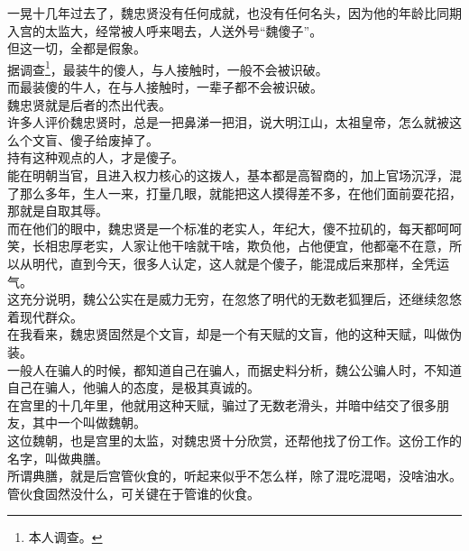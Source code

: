 \begin{multicols}{\theparacolNo}
一晃十几年过去了，魏忠贤没有任何成就，也没有任何名头，因为他的年龄比同期入宫的太监大，经常被人呼来喝去，人送外号“魏傻子”。\\

但这一切，全都是假象。\\

据调查\footnote{本人调查。}，最装牛的傻人，与人接触时，一般不会被识破。\\

而最装傻的牛人，在与人接触时，一辈子都不会被识破。\\

魏忠贤就是后者的杰出代表。\\

许多人评价魏忠贤时，总是一把鼻涕一把泪，说大明江山，太祖皇帝，怎么就被这么个文盲、傻子给废掉了。\\

持有这种观点的人，才是傻子。\\

能在明朝当官，且进入权力核心的这拨人，基本都是高智商的，加上官场沉浮，混了那么多年，生人一来，打量几眼，就能把这人摸得差不多，在他们面前耍花招，那就是自取其辱。\\

而在他们的眼中，魏忠贤是一个标准的老实人，年纪大，傻不拉矶的，每天都呵呵笑，长相忠厚老实，人家让他干啥就干啥，欺负他，占他便宜，他都毫不在意，所以从明代，直到今天，很多人认定，这人就是个傻子，能混成后来那样，全凭运气。\\

这充分说明，魏公公实在是威力无穷，在忽悠了明代的无数老狐狸后，还继续忽悠着现代群众。\\

在我看来，魏忠贤固然是个文盲，却是一个有天赋的文盲，他的这种天赋，叫做伪装。\\

一般人在骗人的时候，都知道自己在骗人，而据史料分析，魏公公骗人时，不知道自己在骗人，他骗人的态度，是极其真诚的。\\

在宫里的十几年里，他就用这种天赋，骗过了无数老滑头，并暗中结交了很多朋友，其中一个叫做魏朝。\\

这位魏朝，也是宫里的太监，对魏忠贤十分欣赏，还帮他找了份工作。这份工作的名字，叫做典膳。\\

所谓典膳，就是后宫管伙食的，听起来似乎不怎么样，除了混吃混喝，没啥油水。\\

管伙食固然没什么，可关键在于管谁的伙食。\\


\end{multicols}
